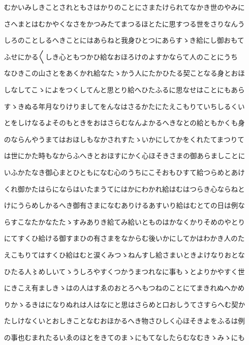 \documentclass[a4paper,11pt,landscape]{ltjtarticle}
\begin{document}
\par\medskip
むかいみしきことされともさはかりのことにさまたけられてなかき世のやみに
\par\medskip
さへまとはむかやくなさをかつみたてまつるほとたに思すつる世をさりなんう
\par\medskip
しろのことしるへきことにはあらねと我身ひとつにあらすゝき給にし御おもて
\par\medskip
ふせにかる〱しき心ともつかひ給なおほろけのよすかならて人のことにうち
\par\medskip
なひきこの山さとをあくかれ給なたゝかう人にたかひたる契ことなる身とおほ
\par\medskip
しなしてこゝによをつくしてんと思とり給へひたふるに思なせはことにもあら
\par\medskip
すゝきぬる年月なりけりましてをんなはさるかたにたえこもりていちしるくい
\par\medskip
とをしけなるよそのもときをおはさらむなんよかるへきなとの給ともかくも身
\par\medskip
のならんやうまてはおほしもなかされすたゝいかにしてかをくれたてまつりて
\par\medskip
は世にかた時もなからふへきとおほすにかく心ほそきさまの御あらましことに
\par\medskip
いふかたなき御心まとひともになむ心のうちにこそおもひすて給つらめとあけ
\par\medskip
くれ御かたはらにならはいたまうてにはかにわかれ給はむはつらき心ならねと
\par\medskip
けにうらめしかるへき御有さまになむありけるあすいり給はむとての日は例な
\par\medskip
らすこなたかなたたゝすみありき給てみ給いとものはかなくかりそめのやとり
\par\medskip
にてすくひ給ける御すまひの有さまをなからむ後いかにしてかはわかき人のた
\par\medskip
えこもりてはすくひ給はむと涙くみつゝねんすし給さまいときよけなりおとな
\par\medskip
ひたる人〻めしいてゝうしろやすくつかうまつれなに事もゝとよりかやすく世
\par\medskip
にきこえ有ましきゝはの人はすゑのおとろへもつねのことにてまきれぬへかめ
\par\medskip
りかゝるきはになりぬれは人はなにと思はさらめと口おしうてさすらへむ契か
\par\medskip
たしけなくいとおしきことなむおほかるへき物さひしく心ほそきよをふるは例
\par\medskip
の事也むまれたるいゑのほとをきてのまゝにもてなしたらむなむきゝみゝにも
\end{document}
